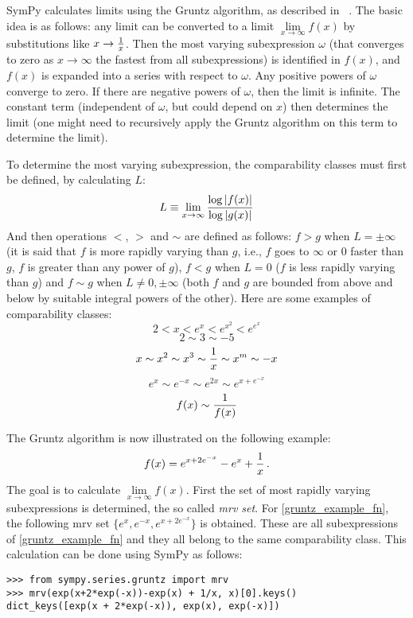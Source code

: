 SymPy calculates limits using the Gruntz algorithm, as described in%
~\cite{Gruntz1996limits}. The basic idea is as follows: any limit can be
converted to a limit $\lim\limits_{x\to\infty} f(x)$ by substitutions like
$x\to{1\over x}$. Then the most varying subexpression $\omega$ (that converges
to zero as $x\to\infty$ the fastest from all subexpressions) is identified in
$f(x)$, and $f(x)$ is expanded into a series with respect to $\omega$. Any
positive powers of $\omega$ converge to zero. If there are negative powers of
$\omega$, then the limit is infinite. The constant term (independent of
$\omega$, but could depend on $x$) then determines the limit (one might need to
recursively apply the Gruntz algorithm on this term to determine the limit).

To determine the most varying subexpression, the comparability classes must
first be defined, by calculating $L$:
\begin{equation}
L\equiv \lim_{x\to\infty} {\log |f(x)| \over \log |g(x)|}
\end{equation}
And then operations $<$, $>$ and $\sim$ are defined as follows: $f>g$ when
$L=\pm\infty$ (it is said that $f$ is more rapidly varying than $g$, i.e., $f$
goes to $\infty$ or $0$ faster than $g$, $f$ is greater than any power of $g$),
$f<g$ when $L=0$ ($f$ is less rapidly varying than $g$) and $f\sim g$ when
$L\neq 0,\pm\infty$ (both $f$ and $g$ are bounded from above and below by
suitable integral powers of the other). Here are some examples of comparability
classes:
$$2 < x < e^x < e^{x^2} < e^{e^x}$$
$$2\sim 3\sim -5$$
$$x\sim x^2\sim x^3\sim {1\over x}\sim x^m\sim -x$$
$$e^x\sim e^{-x}\sim e^{2x}\sim e^{x+e^{-x}}$$
$$f(x)\sim{1\over f(x)}$$

The Gruntz algorithm is now illustrated on the following example:
\begin{equation}
    \label{gruntz_example_fn}
f(x) = e^{x+2e^{-x}} - e^x + {1\over x} \,.
\end{equation}
The goal is to calculate $\lim\limits_{x\to\infty} f(x)$.
First the set of most rapidly varying subexpressions is determined, the so
called \textit{mrv set}. For \eqref{gruntz_example_fn}, the following mrv set
$\{e^x, e^{-x}, e^{x+2e^{-x}}\}$ is obtained. These are all subexpressions of
\eqref{gruntz_example_fn} and they all belong to the same comparability class.
This calculation can be done using SymPy as follows:

\begin{verbatim}
>>> from sympy.series.gruntz import mrv
>>> mrv(exp(x+2*exp(-x))-exp(x) + 1/x, x)[0].keys()
dict_keys([exp(x + 2*exp(-x)), exp(x), exp(-x)])
\end{verbatim}

